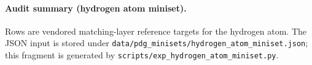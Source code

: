 \paragraph{Audit summary (hydrogen atom miniset).} \AuditTag Rows are vendored matching-layer reference targets for the hydrogen atom. The JSON input is stored under \texttt{data/pdg\_minisets/hydrogen\_atom\_miniset.json}; this fragment is generated by \texttt{scripts/exp\_hydrogen\_atom\_miniset.py}.